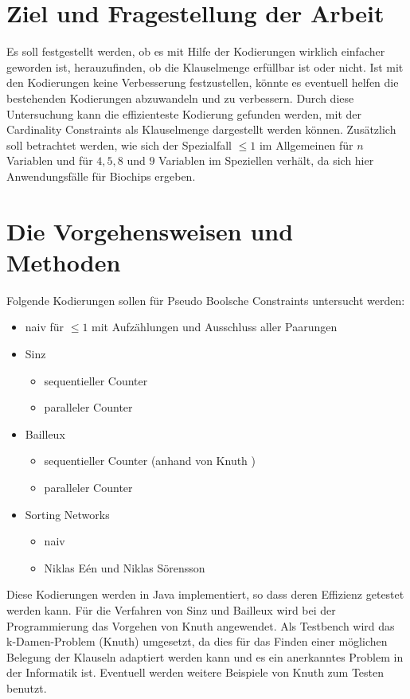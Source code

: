 \documentclass[a4,abstract=on]{scrartcl}
\begin{document}
\section{Ziel und Fragestellung der Arbeit}
Es soll festgestellt werden, ob es mit Hilfe der Kodierungen wirklich einfacher geworden ist, herauzufinden, ob die Klauselmenge erfüllbar ist oder nicht. Ist mit den Kodierungen keine Verbesserung festzustellen, könnte es eventuell helfen die bestehenden Kodierungen abzuwandeln und zu verbessern. 
Durch diese Untersuchung kann die effizienteste Kodierung gefunden werden, mit der Cardinality Constraints als Klauselmenge dargestellt werden können. Zusätzlich soll betrachtet werden, wie sich der Spezialfall $\leq 1$  im Allgemeinen für $n$ Variablen und für $4, 5, 8$ und $9$ Variablen im Speziellen verhält, da sich hier Anwendungsfälle für Biochips ergeben.

\noindent
\section{Die Vorgehensweisen und Methoden}
Folgende Kodierungen sollen für Pseudo Boolsche Constraints untersucht werden:\\
\begin{itemize}
\item naiv für $\leq 1$ mit Aufzählungen und Ausschluss aller Paarungen
\item Sinz \cite[][]{sinz}
	\begin{itemize}
	\item sequentieller Counter
	\item paralleler Counter
	\end{itemize}
\item Bailleux \cite[][]{bailleux}
	\begin{itemize}
	\item sequentieller Counter (anhand von Knuth \cite[][]{knuth})
	\item paralleler Counter 
	\end{itemize}
\item Sorting Networks
	\begin{itemize}
	\item naiv
	\item Niklas Eén und Niklas Sörensson \cite[][]{niklasse}
	\end{itemize}
\end{itemize}
Diese Kodierungen werden in Java implementiert, so dass deren Effizienz getestet werden kann. Für die Verfahren von Sinz und Bailleux wird bei der Programmierung das Vorgehen von Knuth angewendet.
Als Testbench wird das k-Damen-Problem (Knuth) umgesetzt, da dies für das Finden einer möglichen Belegung der Klauseln adaptiert werden kann und es ein anerkanntes Problem in der Informatik ist. Eventuell werden weitere Beispiele von Knuth zum Testen benutzt.
\end{document}
